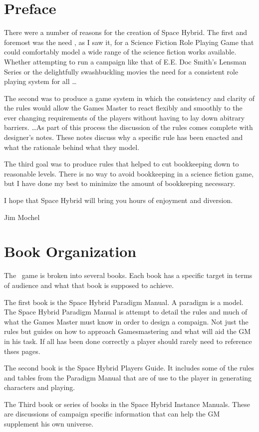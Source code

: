 \chapter*{Preface}

There were a number of reasons for the creation of Space Hybrid. The 
first and foremost was the need , as I saw it, for a Science 
Fiction Role Playing Game that could comfortably model a wide range
of the science fiction works available. Whether attempting to run 
a campaign like that of E.E. Doc Smith's Lensman Series or the 
delightfully swashbuckling  movies the need for a consistent
role playing system for all \dots

The second was to produce a game system in which the consistency 
and clarity of the rules would allow the Games Master to 
react flexibly and smoothly to the ever changing requirements
of the players without having to lay down abitrary barriers.
\dots As part of this process the discussion of the rules comes 
complete with designer's notes. These notes discuss why a 
specific rule has been enacted and what the rationale behind 
what they model. 

The third goal was to produce rules that helped to cut
bookkeeping down to reasonable levels. There is no way to avoid 
bookkeeping in a science fiction game, but I have done my best to
minimize the amount of bookkeeping necessary.

I hope that Space Hybrid will bring you hours of enjoyment and
diversion.

\begin{em}
	Jim Mochel
\end{em}

\chapter*{Book Organization}

The \SH\ game is broken into several books. Each book has
a specific target in terms of audience and what that book is supposed 
to achieve.

The first book is the Space Hybrid Paradigm Manual. A paradigm is a model.
The Space Hybrid Paradigm Manual is attempt to detail the rules and 
much of what the Games Master must know in order to design a compaign. 
Not just the rules but guides on how to approach Gamesmastering and what will aid the 
GM in his task. If all has been done correctly a player should rarely need to reference 
thses pages.

The second book is the Space Hybrid Players Guide. It includes 
some of the rules and tables from the Paradigm Manual that are of use to
the player in generating characters and playing. 

The Third book or series of books in the Space Hybrid Instance Manuals.
These are discussions of campaign specific information that can help the
GM supplement his own universe.



